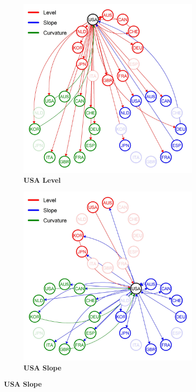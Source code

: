 \documentclass[12pt,bibliography=totoc]{article}
\begin{document}
\begin{figure}[H]

  \begin{subfigure}[t]{.5\textwidth}
    \centering
    \includegraphics[width=\linewidth]{node_USA_B_1_1998-09-30_2021-12-29_TY_fix}
    \caption{\textbf{USA Level}}
  \end{subfigure}
  \hfill
  \begin{subfigure}[t]{.5\textwidth}
    \centering
    \includegraphics[width=\linewidth]{node_USA_B_2_1998-09-30_2021-12-29_TY_fix}
    \caption{\textbf{USA Slope}}
  \end{subfigure}


\end{figure}
\end{document}
